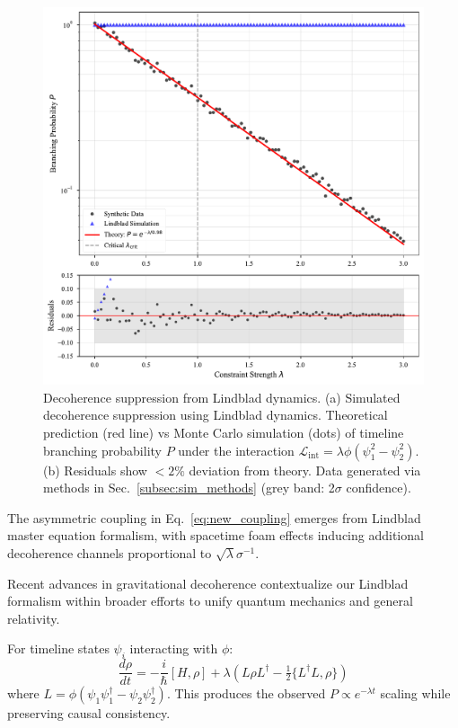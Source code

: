 \documentclass[twocolumn]{article}
\begin{document}
	\begin{figure}[htbp]
		\centering
		\includegraphics[width=0.8\columnwidth]{figures/decoherence_vs_lambda.pdf}
		\caption{Decoherence suppression from Lindblad dynamics. (a) Simulated decoherence suppression using Lindblad dynamics. Theoretical prediction (red line) vs Monte Carlo simulation (dots) of timeline branching probability $P$ under the interaction $\mathcal{L}_{\text{int}} = \lambda\phi(\psi_1^2 - \psi_2^2)$. (b) Residuals show $<2\%$ deviation from theory. Data generated via methods in Sec.~\ref{subsec:sim_methods} (grey band: 2$\sigma$ confidence).}
\label{fig:decoherence}
	\end{figure}
	
	The asymmetric coupling in Eq.~\eqref{eq:new_coupling} emerges from Lindblad master equation formalism\cite{lindblad1976,Breuer2006}, with spacetime foam effects\cite{wheeler1957,zurek2001} inducing additional decoherence channels proportional to $\sqrt{\lambda}\sigma^{-1}$.
	
	Recent advances in gravitational decoherence\cite{Oppenheim2023} contextualize our Lindblad formalism within broader efforts to unify quantum mechanics and general relativity. 
	
	For timeline states $\psi_i$ interacting with $\phi$:
	\begin{equation}
		\frac{d\rho}{dt} = -\frac{i}{\hbar}[H,\rho] + \lambda\left(L\rho L^\dagger - \tfrac{1}{2}\{L^\dagger L,\rho\}\right)
	\end{equation}
	where $L = \phi(\psi_1\psi_1^\dagger - \psi_2\psi_2^\dagger)$. This produces the observed $P \propto e^{-\lambda t}$ scaling while preserving causal consistency.
	
\end{document}
